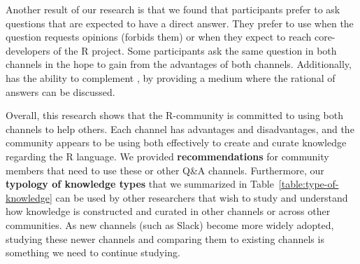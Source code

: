 Another result of our research is that we found that participants prefer \SO to ask questions that are expected to have a direct answer. They prefer to use \RH when the
question requests opinions (\SO forbids them) or when they expect to reach core-developers of the R project. Some participants ask the same question in both
channels in the hope to gain from the advantages of both channels. Additionally, \RH has the ability to complement \SO, by providing a medium where the rational
of answers can be discussed.

Overall, this research shows that the R-community is committed to using both channels to help others. Each channel has advantages and disadvantages, and the
community appears to be using both effectively to create and curate knowledge regarding the R language.  We provided \textbf{recommendations} for community members that need to use these or other Q\&A channels.  Furthermore, our \textbf{typology of knowledge types} that we summarized in Table~\ref{table:type-of-knowledge} can be used by other researchers that wish to study and understand how knowledge is constructed and curated in other channels or across other communities.  As new channels (such as Slack) become more widely adopted, studying these newer channels and comparing them to existing channels is something we need to continue studying. 








